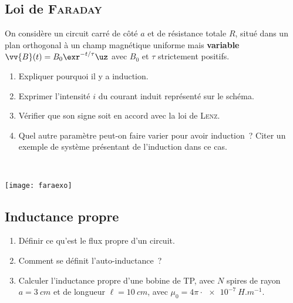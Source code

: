 \documentclass[11pt]{book}
\begin{document}
{	\subsection{Loi de \textsc{Faraday}}
	\label{ssec:faraday}
	\noindent
	\begin{minipage}[t]{.75\linewidth}
		On considère un circuit carré de côté $a$ et de résistance totale $R$, situé
		dans un plan orthogonal à un champ magnétique uniforme mais \textbf{variable}
		$\vv{B}(t) = B_0\exr^{-t/\tau}\uz$ avec $B_0$ et $\tau$ strictement positifs.
		\begin{enumerate}[start=7]
			\item Expliquer pourquoi il y a induction.
			\item Exprimer l'intensité $i$ du courant induit représenté sur le schéma.
			\item Vérifier que son signe soit en accord avec la loi de \textsc{Lenz}.
			\item Quel autre paramètre peut-on faire varier pour avoir induction~? Citer
			      un exemple de système présentant de l'induction dans ce cas.
		\end{enumerate}
	\end{minipage}
	\hfill
	\begin{minipage}[t]{.20\linewidth}
		~
		\vspace*{-20pt}
		\begin{center}
			\texttt{[image: faraexo]}
			\label{fig:faraexo}
		\end{center}
	\end{minipage}

	\subsection{Inductance propre}
	\label{ssec:indprp}
	\begin{enumerate}[start=11]
		\item Définir ce qu'est le flux propre d'un circuit.
		\item Comment se définit l'auto-inductance~?
		\item Calculer l'inductance propre d'une bobine de TP, avec $N$ spires de
		      rayon $a = \SI{3}{cm}$ et de longueur $\ell = \SI{10}{cm}$, avec $\mu_0 =
			      4\pi \cdot \SI{e-7}{H.m^{-1}}$.
	\end{enumerate}

	\newpage
}{
}
\end{document}
